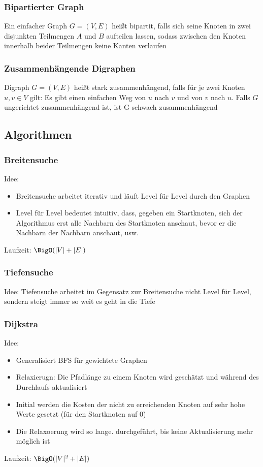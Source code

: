 \documentclass[a4paper]{article}
\begin{document}
	\subsubsection{Bipartierter Graph}
		Ein einfacher Graph $G=(V,E)$ heißt bipartit, falls sich seine Knoten in zwei disjunkten Teilmengen $A$ und $B$ aufteilen lassen, sodass zwischen den Knoten innerhalb beider Teilmengen keine Kanten verlaufen
	\subsubsection{Zusammenhängende Digraphen}
		Digraph $G=(V,E)$ heißt stark zusammenhängend, falls für je zwei Knoten $u,v\in V$ gilt: Es gibt einen einfachen Weg von $u$ nach $v$ und von $v$ nach $u$. Falls $G$ ungerichtet zusammenhängend ist, ist G schwach zusammenhängend
	\subsection{Algorithmen}
	\subsubsection{Breitensuche}
		Idee: 
		\begin{itemize}
		  \item Breitensuche arbeitet iterativ und läuft Level für Level durch den Graphen
		  \item Level für Level bedeutet intuitiv, dass, gegeben ein Startknoten, sich der Algorithmus erst alle Nachbarn des Startknoten anschaut, bevor er die Nachbarn der Nachbarn anschaut, usw.
		\end{itemize}
		Laufzeit: $\BigO(|V|+|E|)$
	\subsubsection{Tiefensuche}
		Idee: Tiefensuche arbeitet im Gegensatz zur Breitensuche nicht Level für Level, sondern steigt immer so weit es geht in die Tiefe
	\subsubsection{Dijkstra}
		Idee:
		\begin{itemize}
		  \item Generalisiert BFS für gewichtete Graphen
		  \item Relaxierugn: Die Pfadlänge zu einem Knoten wird geschätzt und während des Durchlaufs aktualisiert 
		  \item Initial werden die Kosten der nicht zu erreichenden Knoten auf sehr hohe Werte gesetzt (für den Startknoten auf 0) 
		  \item Die Relaxoerung wird so lange. durchgeführt, bis keine Aktualisierung mehr möglich ist
		\end{itemize}
		Laufzeit: $\BigO(|V|^2+|E|)$
\end{document}
